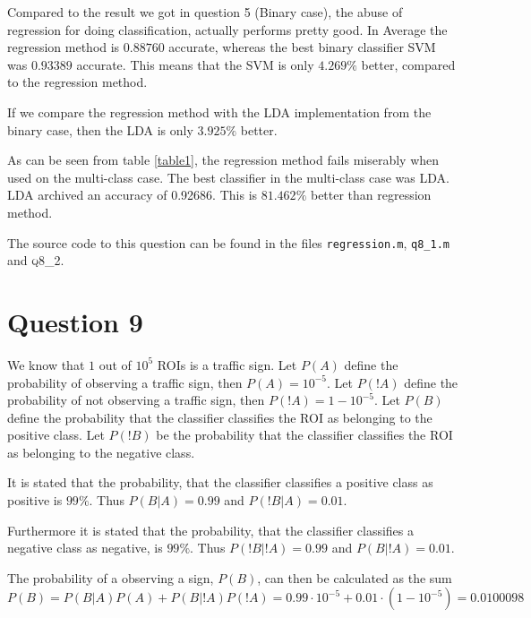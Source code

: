 \documentclass[10pt]{article}
\begin{document}
Compared to the result we got in question 5 (Binary case), the abuse of regression for doing classification, actually performs pretty good. In Average the regression method is $0.88760$ accurate, whereas the best binary classifier SVM was $0.93389$ accurate. This means that the SVM is only $4.269\%$ better, compared to the regression method.

If we compare the regression method with the LDA implementation from the binary case, then the LDA is only $3.925\%$ better.

As can be seen from table \ref{table1}, the regression method fails miserably when used on the multi-class case. The best classifier in the multi-class case was LDA. LDA archived an accuracy of 0.92686. This is $81.462\%$ better than regression method.
                                                                                                                    
The source code to this question can be found in the files \texttt{regression.m}, \texttt{q8\_1.m} and \textsc{q8\_2}. 


\section*{Question 9} %
\label{sec:question_9}

We know that $1$ out of $10^5$ ROIs is a traffic sign. Let $P(A)$ define the probability of observing a traffic sign, then $P(A) = 10^{-5}$. Let $P(!A)$ define the probability of not observing a traffic sign, then $P(!A) = 1-10^{-5}$. Let $P(B)$ define the probability that the classifier classifies the ROI as belonging to the positive class. Let $P(!B)$ be the probability that the classifier classifies the ROI as belonging to the negative class. 

It is stated that the probability, that the classifier classifies a positive class as positive is $99\%$\cite{assignment}. Thus $P(B|A)=0.99$ and $P(!B|A)=0.01$. 

Furthermore it is stated that the probability, that the classifier classifies a negative class as negative, is $99\%$\cite{assignment}. Thus $P(!B|!A) = 0.99$ and $P(B|!A) = 0.01$.

The probability of a observing a sign, $P(B)$, can then be calculated as the sum  
\begin{equation}
  P(B) = P(B|A)P(A)+P(B|!A)P(!A) = 0.99 \cdot 10^{-5} + 0.01 \cdot (1-10^{-5}) = 0.0100098
\end{equation} 
\end{document}
